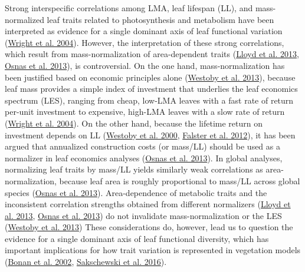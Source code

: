 \documentclass[
  12pt,
]{article}
\begin{document}
Strong interspecific correlations among LMA, leaf lifespan (LL), and mass-normalized leaf traits related to photosynthesis and metabolism have been interpreted as evidence for a single dominant axis of leaf functional variation (\protect\hyperlink{ref-Wright2004a}{Wright et al. 2004}).
However, the interpretation of these strong correlations, which result from mass-normalization of area-dependent traits (\protect\hyperlink{ref-Lloyd2013}{Lloyd et al. 2013}, \protect\hyperlink{ref-Osnas2013}{Osnas et al. 2013}), is controversial.
On the one hand, mass-normalization has been justified based on economic principles alone (\protect\hyperlink{ref-Westoby2013}{Westoby et al. 2013}), because leaf mass provides a simple index of investment that underlies the leaf economics spectrum (LES), ranging from cheap, low-LMA leaves with a fast rate of return per-unit investment to expensive, high-LMA leaves with a slow rate of return (\protect\hyperlink{ref-Wright2004a}{Wright et al. 2004}).
On the other hand, because the lifetime return on investment depends on LL (\protect\hyperlink{ref-Westoby2000}{Westoby et al. 2000}, \protect\hyperlink{ref-Falster2012}{Falster et al. 2012}), it has been argued that annualized construction costs (or mass/LL) should be used as a normalizer in leaf economics analyses (\protect\hyperlink{ref-Osnas2013}{Osnas et al. 2013}).
In global analyses, normalizing leaf traits by mass/LL yields similarly weak correlations as area-normalization, because leaf area is roughly proportional to mass/LL across global species (\protect\hyperlink{ref-Osnas2013}{Osnas et al. 2013}).
Area-dependence of metabolic traits and the inconsistent correlation strengths obtained from different normalizers (\protect\hyperlink{ref-Lloyd2013}{Lloyd et al. 2013}, \protect\hyperlink{ref-Osnas2013}{Osnas et al. 2013}) do not invalidate mass-normalization or the LES (\protect\hyperlink{ref-Westoby2013}{Westoby et al. 2013})
These considerations do, however, lead us to question the evidence for a single dominant axis of leaf functional diversity, which has important implications for how trait variation is represented in vegetation models (\protect\hyperlink{ref-Bonan2002}{Bonan et al. 2002}, \protect\hyperlink{ref-Sakschewski2016}{Sakschewski et al. 2016}).
\end{document}
